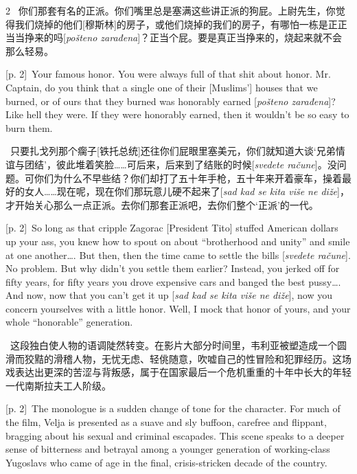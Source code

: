 \documentclass[10pt,a4paper]{article}
\begin{document}
\begin{paracol}{2}
\switchcolumn*
{\scriptsize\color{gray} [p. 2]}\ 你们那套有名的正派。你们嘴里总是塞满这些讲正派的狗屁。上尉先生，你觉得我们烧掉的他们[穆斯林]的房子，或他们烧掉的我们的房子，有哪怕一栋是正正当当挣来的吗[\textit{pošteno zarađena}]？正当个屁。要是真正当挣来的，烧起来就不会那么轻易。\par
\switchcolumn
{\scriptsize\color{gray} [p. 2]}\ Your famous honor. You were always full of that shit about honor. Mr. Captain, do you think that a single one of their [Muslims’] houses that we burned, or of ours that they burned was honorably earned [\textit{pošteno zarađena}]? Like hell they were. If they were honorably earned, then it wouldn’t be so easy to burn them.\par
\switchcolumn*
{\scriptsize\color{gray} [p. 2]}\ 只要扎戈列那个瘸子[铁托总统]还往你们屁眼里塞美元，你们就知道大谈‘兄弟情谊与团结’，彼此堆着笑脸……可后来，后来到了结账的时候[\textit{svedete račune}]。没问题。可你们为什么不早些结？你们却打了五十年手枪，五十年来开着豪车，操着最好的女人……现在呢，现在你们那玩意儿硬不起来了[\textit{sad kad se kita više ne diže}]，才开始关心那么一点正派。去你们那套正派吧，去你们整个‘正派’的一代。\par
\switchcolumn
{\scriptsize\color{gray} [p. 2]}\ So long as that cripple Zagorac [President Tito] stuffed American dollars up your ass, you knew how to spout on about “brotherhood and unity” and smile at one another…. But then, then the time came to settle the bills [\textit{svedete račune}]. No problem. But why didn’t you settle them earlier? Instead, you jerked off for fifty years, for fifty years you drove expensive cars and banged the best pussy…. And now, now that you can’t get it up [\textit{sad kad se kita više ne diže}], now you concern yourselves with a little honor. Well, I mock that honor of yours, and your whole “honorable” generation.\par
\switchcolumn*
{\scriptsize\color{gray} [p. 2]}\ 这段独白使人物的语调陡然转变。在影片大部分时间里，韦利亚被塑造成一个圆滑而狡黠的滑稽人物，无忧无虑、轻佻随意，吹嘘自己的性冒险和犯罪经历。这场戏表达出更深的苦涩与背叛感，属于在国家最后一个危机重重的十年中长大的年轻一代南斯拉夫工人阶级。\par
\switchcolumn
{\scriptsize\color{gray} [p. 2]}\ The monologue is a sudden change of tone for the character. For much of the film, Velja is presented as a suave and sly buffoon, carefree and flippant, bragging about his sexual and criminal escapades. This scene speaks to a deeper sense of bitterness and betrayal among a younger generation of working-class Yugoslavs who came of age in the final, crisis-stricken decade of the country.\par

\end{paracol}
\end{document}
